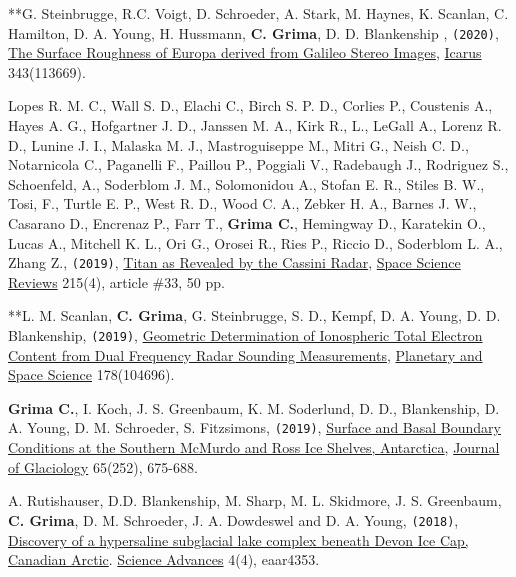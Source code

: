 \begin{etaremune}
  **G. Steinbrugge, R.C. Voigt, D. Schroeder, A. Stark, M. Haynes, K. Scanlan, C. Hamilton, D. A. Young, H. Hussmann, \textbf{C. Grima}, D. D. Blankenship , \texttt{(2020)}, \href{https://www.sciencedirect.com/science/article/abs/pii/S0019103519301526}{The Surface Roughness of Europa derived from Galileo Stereo Images}, \ul{Icarus} 343(113669).
\item
  Lopes R. M. C., Wall S. D., Elachi C., Birch S. P. D., Corlies P., Coustenis A., Hayes A. G., Hofgartner J. D., Janssen M. A., Kirk R., L., LeGall A., Lorenz R. D., Lunine J. I., Malaska M. J., Mastroguiseppe M., Mitri G., Neish C. D., Notarnicola C., Paganelli F., Paillou P., Poggiali V., Radebaugh J., Rodriguez S., Schoenfeld, A., Soderblom J. M., Solomonidou A., Stofan E. R., Stiles B. W., Tosi, F., Turtle E. P., West R. D., Wood C. A., Zebker H. A., Barnes J. W., Casarano D., Encrenaz P., Farr T., \textbf{Grima C.}, Hemingway D., Karatekin O., Lucas A., Mitchell K. L., Ori G., Orosei R., Ries P., Riccio D., Soderblom L. A., Zhang Z., \texttt{(2019)}, \href{https://ui.adsabs.harvard.edu/abs/2019SSRv..215...33L/abstract}{Titan as Revealed by the Cassini Radar}, \ul{Space Science Reviews} 215(4), article \#33, 50 pp.
\item
  **L. M. Scanlan, \textbf{C. Grima}, G. Steinbrugge, S. D., Kempf, D. A. Young, D. D. Blankenship, \texttt{(2019)}, \href{https://www.sciencedirect.com/science/article/pii/S0032063319300820}{Geometric Determination of Ionospheric Total Electron Content from Dual Frequency Radar Sounding Measurements}, \ul{Planetary and Space Science} 178(104696).
\item
  \textbf{Grima C.}, I. Koch, J. S. Greenbaum, K. M. Soderlund, D. D., Blankenship, D. A. Young, D. M. Schroeder, S. Fitzsimons, \texttt{(2019)}, \href{https://www.cambridge.org/core/journals/journal-of-glaciology/article/surface-and-basal-boundary-conditions-at-the-southern-mcmurdo-and-ross-ice-shelves-antarctica/3ED3BFD465A3F6A5FC48342694F91EC5}{Surface and Basal Boundary Conditions at the Southern McMurdo and Ross Ice Shelves, Antarctica}, \ul{Journal of Glaciology} 65(252), 675-688.
\item
  A. Rutishauser, D.D. Blankenship, M. Sharp, M. L.
  Skidmore, J. S. Greenbaum, \textbf{C. Grima}, D. M. Schroeder, J. A.
  Dowdeswel and D. A. Young, \texttt{(2018)},
  \href{http://advances.sciencemag.org/content/4/4/eaar4353}{Discovery
  of a hypersaline subglacial lake complex beneath Devon Ice Cap,
  Canadian Arctic}. \ul{Science Advances} 4(4), eaar4353.
\item

\end{etaremune}
